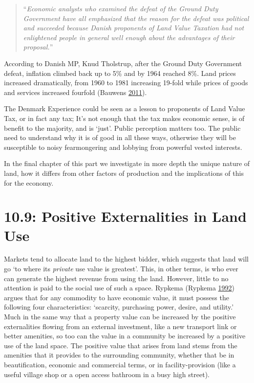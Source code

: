 \documentclass[]{tufte-handout}
\begin{document}
\begin{quote}
``\emph{Economic analysts who examined the defeat of the Ground Duty
Government have all emphasized that the reason for the defeat was
political and succeeded because Danish proponents of Land Value Taxation
had not enlightened people in general well enough about the advantages
of their proposal.}''
\end{quote}

According to Danish MP, Knud Tholstrup, after the Ground Duty Government
defeat, inflation climbed back up to 5\% and by 1964 reached 8\%. Land
prices increased dramatically, from 1960 to 1981 increasing 19-fold
while prices of goods and services increased fourfold (Bauwens
\protect\hyperlink{ref-Bauwens2011}{2011}).

The Denmark Experience could be seen as a lesson to proponents of Land
Value Tax, or in fact any tax; It's not enough that the tax makes
economic sense, is of benefit to the majority, and is `just'. Public
perception matters too. The public need to understand why it is of good
in all these ways, otherwise they will be susceptible to noisy
fearmongering and lobbying from powerful vested interests.

In the final chapter of this part we investigate in more depth the
unique nature of land, how it differs from other factors of production
and the implications of this for the economy.

\hypertarget{positive-externalities-in-land-use}{%
\section{10.9: Positive Externalities in Land
Use}\label{positive-externalities-in-land-use}}

Markets tend to allocate land to the highest bidder, which suggests that
land will go `to where its \emph{private} use value is greatest'. This,
in other terms, is who ever can generate the highest revenue from using
the land. However, little to no attention is paid to the social use of
such a space. Rypkema (Rypkema
\protect\hyperlink{ref-Rypkema1992a}{1992}) argues that for any
commodity to have economic value, it must possess the following four
characteristics: `scarcity, purchasing power, desire, and utility.' Much
in the same way that a property value can be increased by the positive
externalities flowing from an external investment, like a new transport
link or better amenities, so too can the value in a community be
increased by a positive use of the land space. The positive value that
arises from land stems from the amenities that it provides to the
surrounding community, whether that be in beautification, economic and
commercial terms, or in facility-provision (like a useful village shop
or a open access bathroom in a busy high street).
\end{document}
